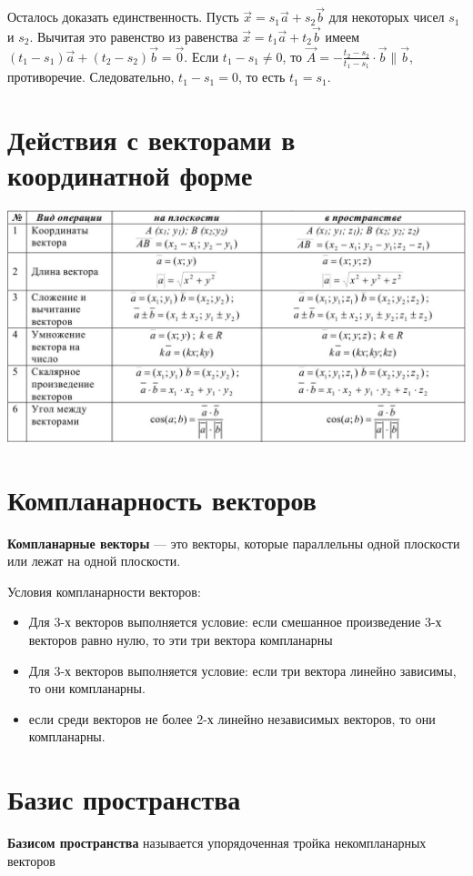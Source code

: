 \documentclass[a4paper]{article}
\begin{document}
{\begin{small}
Осталось доказать единственность. Пусть $\vec{x} = s_1 \vec{a} + s_2 \vec{b}$ для некоторых  чисел $s_1$ и $s_2$. Вычитая это равенство из равенства $\vec{x} = t_1 \vec{a} + t_2 \vec{b}$ имеем $(t_1 - s_1) \vec{a} + (t_2 - s_2) \vec{b} = \vec{0}$. Если $t_1-s_1 \neq 0$, то $\displaystyle \vec{A} = - \frac{t_2 - s_2}{t_1 - s_1} \cdot \vec{b} \parallel \vec{b}$, противоречие. Следовательно, $t_1 - s_1 = 0$, то есть $t_1 = s_1$. 

\section*{Действия с векторами в координатной форме}

\includegraphics[width=18cm]{t2}
\section*{Компланарность векторов}
\textbf{Компланарные векторы} — это векторы, которые параллельны одной плоскости или лежат на одной плоскости. 

Условия компланарности векторов:\begin{itemize}
\item Для 3-х векторов выполняется условие: если смешанное произведение 3-х векторов равно нулю, то эти три вектора компланарны
\item Для 3-х векторов выполняется условие: если три вектора линейно зависимы, то они компланарны.
\item если среди векторов не более 2-х линейно независимых векторов, то они компланарны.
\end{itemize}
\section*{Базис пространства}
\textbf{Базисом пространства }называется упорядоченная тройка некомпланарных
векторов


\end{small}}
\end{document}
